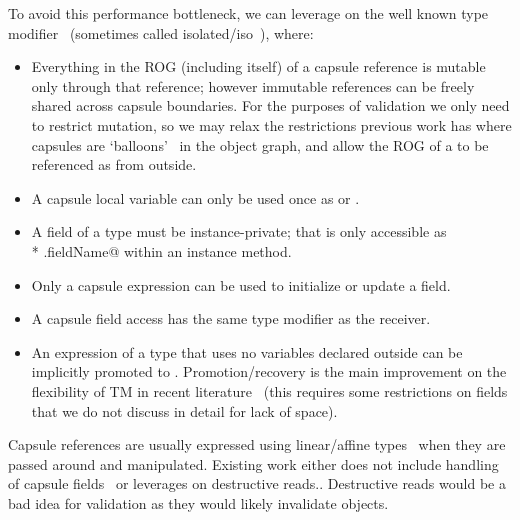 To avoid this performance bottleneck, we can leverage on the well known \Q@capsule@ type modifier~\cite{ServettoEtAl13a,ServettoZucca15,ServettoEtAl13a}
(sometimes called isolated/iso~\cite{GordonEtAl12,clebsch2015deny,clebsch2017orca}), where:
\begin{itemize}
\item Everything in the ROG (including itself) of a capsule reference is mutable only through that reference; however immutable references can be freely shared across capsule boundaries.
For the purposes of validation we only need to restrict mutation, so we may relax the restrictions previous work has where capsules are `balloons'~\cite{Almeida97,ServettoEtAl13a} in the object graph, and allow the ROG of a \Q@capsule@ to be referenced as \Q@read@ from outside.
\item A capsule local variable can only be used once as \Q@capsule@ or \Q@mut@.
\item A field of a \Q@capsule@ type must be instance-private; that is only accessible as\\* \Q@this.fieldName@ within an instance method.
\item Only a capsule expression can be used to initialize or update a \Q@capsule@ field.
\item A capsule field access has the same type modifier as the receiver.
\item An expression of a \Q@mut@ type that uses no \Q@mut@ variables declared outside can be implicitly promoted to \Q@capsule@. Promotion/recovery is the main improvement on the flexibility of TM in recent literature~\cite{ServettoEtAl13a,ServettoZucca15,GordonEtAl12,clebsch2015deny,clebsch2017orca}
(this requires some restrictions on \Q@read@ fields that we do not discuss in detail for lack of space).
\end{itemize}

\noindent Capsule references are usually expressed using linear/affine types~\cite{Boyland01} when they are passed around and manipulated. Existing work either does not include handling of capsule fields~\cite{ServettoEtAl13a,ServettoZucca15} or leverages on destructive reads.\cite{GordonEtAl12,clebsch2015deny}.
Destructive reads would be a bad idea for validation as they would likely invalidate objects.

